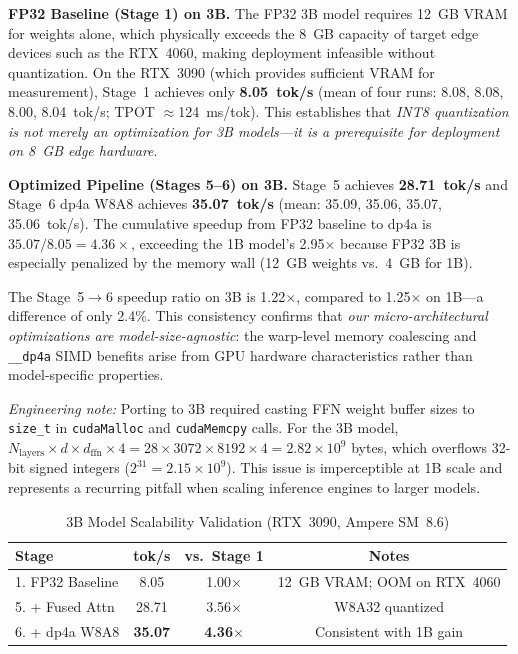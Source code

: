 \documentclass[conference]{IEEEtran}
\begin{document}
\textbf{FP32 Baseline (Stage 1) on 3B.}
The FP32 3B model requires 12~GB VRAM for weights alone, which physically exceeds the 8~GB capacity of target edge devices such as the RTX~4060, making deployment infeasible without quantization. On the RTX~3090 (which provides sufficient VRAM for measurement), Stage~1 achieves only \textbf{8.05~tok/s} (mean of four runs: 8.08, 8.08, 8.00, 8.04~tok/s; TPOT $\approx$124~ms/tok). This establishes that \emph{INT8 quantization is not merely an optimization for 3B models---it is a prerequisite for deployment on 8~GB edge hardware}.

\textbf{Optimized Pipeline (Stages 5--6) on 3B.}
Stage~5 achieves \textbf{28.71~tok/s} and Stage~6 dp4a W8A8 achieves \textbf{35.07~tok/s} (mean: 35.09, 35.06, 35.07, 35.06~tok/s).
The cumulative speedup from FP32 baseline to dp4a is $35.07 / 8.05 = \mathbf{4.36}\times$, exceeding the 1B model's 2.95$\times$ because FP32 3B is especially penalized by the memory wall (12~GB weights vs.\ 4~GB for 1B).

The Stage~5$\to$6 speedup ratio on 3B is 1.22$\times$, compared to 1.25$\times$ on 1B---a difference of only 2.4\%.
This consistency confirms that \emph{our micro-architectural optimizations are model-size-agnostic}: the warp-level memory coalescing and \texttt{\_\_dp4a} SIMD benefits arise from GPU hardware characteristics rather than model-specific properties.

\textit{Engineering note:} Porting to 3B required casting FFN weight buffer sizes to \texttt{size\_t} in \texttt{cudaMalloc} and \texttt{cudaMemcpy} calls. For the 3B model, $N_{\text{layers}} \times d \times d_{\text{ffn}} \times 4 = 28 \times 3072 \times 8192 \times 4 = 2.82 \times 10^9$ bytes, which overflows 32-bit signed integers ($2^{31} = 2.15 \times 10^9$). This issue is imperceptible at 1B scale and represents a recurring pitfall when scaling inference engines to larger models.

\begin{table}[htbp]
\centering
\caption{3B Model Scalability Validation (RTX~3090, Ampere SM~8.6)}
\label{tab:3b_validation}
\setlength{\tabcolsep}{4pt}
\scriptsize
\begin{tabular}{lccc}
\toprule
\textbf{Stage} & \textbf{tok/s} & \textbf{vs.\ Stage 1} & \textbf{Notes} \\
\midrule
1. FP32 Baseline & 8.05 & 1.00$\times$ & 12~GB VRAM; OOM on RTX~4060 \\
5. + Fused Attn  & 28.71 & 3.56$\times$ & W8A32 quantized \\
6. + dp4a W8A8   & \textbf{35.07} & \textbf{4.36}$\times$ & Consistent with 1B gain \\
\bottomrule
\end{tabular}
\end{table}
\end{document}
